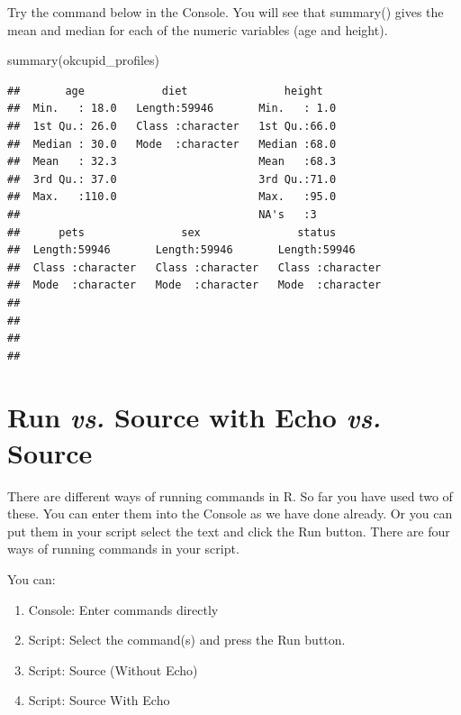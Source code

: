 \documentclass[
]{krantz}
\makeatletter
\newenvironment{Shaded}{\begin{snugshade}}{\end{snugshade}}
\newcommand{\FunctionTok}[1]{\textcolor[rgb]{0,0,0}{#1}}
\newcommand{\NormalTok}[1]{#1}
\providecommand{\tightlist}{%
  \setlength{\itemsep}{0pt}\setlength{\parskip}{0pt}}
\newenvironment{kframe}{%
\medskip{}
\setlength{\fboxsep}{.8em}
 \def\at@end@of@kframe{}%
 \ifinner\ifhmode%
  \def\at@end@of@kframe{\end{minipage}}%
  \begin{minipage}{\columnwidth}%
 \fi\fi%
 \def\FrameCommand##1{\hskip\@totalleftmargin \hskip-\fboxsep
 \colorbox{shadecolor}{##1}\hskip-\fboxsep
     \hskip-\linewidth \hskip-\@totalleftmargin \hskip\columnwidth}%
 \MakeFramed {\advance\hsize-\width
   \@totalleftmargin\z@ \linewidth\hsize
   \@setminipage}}%
 {\par\unskip\endMakeFramed%
 \at@end@of@kframe}
\renewenvironment{Shaded}{\begin{kframe}}{\end{kframe}}
\makeatother
\begin{document}
Try the command below in the Console. You will see that summary() gives the mean and median for each of the numeric variables (age and height).

\begin{Shaded}
\begin{Highlighting}[]
\FunctionTok{summary}\NormalTok{(okcupid\_profiles)}
\end{Highlighting}
\end{Shaded}

\begin{verbatim}
##       age            diet               height    
##  Min.   : 18.0   Length:59946       Min.   : 1.0  
##  1st Qu.: 26.0   Class :character   1st Qu.:66.0  
##  Median : 30.0   Mode  :character   Median :68.0  
##  Mean   : 32.3                      Mean   :68.3  
##  3rd Qu.: 37.0                      3rd Qu.:71.0  
##  Max.   :110.0                      Max.   :95.0  
##                                     NA's   :3     
##      pets               sex               status         
##  Length:59946       Length:59946       Length:59946      
##  Class :character   Class :character   Class :character  
##  Mode  :character   Mode  :character   Mode  :character  
##                                                          
##                                                          
##                                                          
## 
\end{verbatim}

\hypertarget{run-vs.-source-with-echo-vs.-source}{%
\section{\texorpdfstring{Run \emph{vs.} Source with Echo \emph{vs.} Source}{Run vs. Source with Echo vs. Source}}\label{run-vs.-source-with-echo-vs.-source}}

There are different ways of running commands in R. So far you have used two of these. You can enter them into the Console as we have done already. Or you can put them in your script select the text and click the Run button. There are four ways of running commands in your script.

You can:

\begin{enumerate}
\def\labelenumi{\arabic{enumi}.}
\tightlist
\item
  Console: Enter commands directly
\item
  Script: Select the command(s) and press the Run button.
\item
  Script: Source (Without Echo)
\item
  Script: Source With Echo
\end{enumerate}
\end{document}
